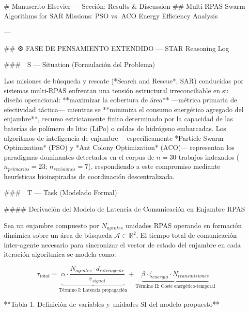 
# Manuscrito Elsevier — Sección: Results & Discussion
## Multi-RPAS Swarm Algorithms for SAR Missions: PSO vs. ACO Energy Efficiency Analysis

---

## ⚙️ FASE DE PENSAMIENTO EXTENDIDO — STAR Reasoning Log

### 🔷 S — Situation (Formulación del Problema)

Las misiones de búsqueda y rescate (*Search and Rescue*, SAR) conducidas por sistemas multi-RPAS enfrentan una tensión estructural irreconciliable en su diseño operacional: **maximizar la cobertura de área** —métrica primaria de efectividad táctica— mientras se **minimiza el consumo energético agregado del enjambre**, recurso estrictamente finito determinado por la capacidad de las baterías de polímero de litio (LiPo) o celdas de hidrógeno embarcadas. Los algoritmos de inteligencia de enjambre —específicamente *Particle Swarm Optimization* (PSO) y *Ant Colony Optimization* (ACO)— representan los paradigmas dominantes detectados en el corpus de $n = 30$ trabajos indexados ($n_{primarios} = 23$; $n_{revisiones} = 7$), respondiendo a este compromiso mediante heurísticas bioinspiradas de coordinación descentralizada.

### 🔷 T — Task (Modelado Formal)

#### Derivación del Modelo de Latencia de Comunicación en Enjambre RPAS

Sea un enjambre compuesto por $N_{agentes}$ unidades RPAS operando en formación dinámica sobre un área de búsqueda $\mathcal{A} \subset \mathbb{R}^2$. El tiempo total de comunicación inter-agente necesario para sincronizar el vector de estado del enjambre en cada iteración algorítmica se modela como:

$$
\boxed{
\tau_{total} = \underbrace{\alpha \cdot \frac{N_{agentes} \cdot d_{interagente}}{v_{signal}}}_{\text{Término I: Latencia propagación}} + \underbrace{\beta \cdot \zeta_{energia} \cdot N_{transmisiones}}_{\text{Término II: Coste energético-temporal}}
}
$$

**Tabla 1. Definición de variables y unidades SI del modelo propuesto**


